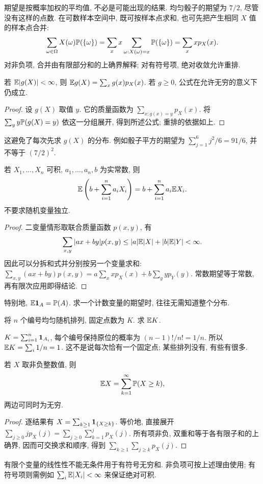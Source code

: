期望是按概率加权的平均值, 不必是可能出现的结果. 均匀骰子的期望为 $7/2$, 尽管没有这样的点数. 在可数样本空间中, 既可按样本点求和, 也可先把产生相同 $X$ 值的样本点合并:
\[
\sum_{\omega\in\Omega}X(\omega)\mathbb P(\{\omega\})
=\sum_xx\sum_{\omega:X(\omega)=x}\mathbb P(\{\omega\})
=\sum_xxp_X(x).
\]
对非负项, 合并由有限部分和的上确界解释; 对有符号项, 绝对收敛允许重排.
\begin{proposition}[函数的期望]
若 $\mathbb E|g(X)|<\infty$, 则 $\mathbb E g(X)=\sum_xg(x)p_X(x)$. 若 $g\ge0$, 公式在允许无穷的意义下仍成立.
\end{proposition}
\begin{proof}
设 $g(X)$ 取值 $y$. 它的质量函数为 $\sum_{x:g(x)=y}p_X(x)$. 将 $\sum_yy\mathbb P(g(X)=y)$ 依这一分组展开, 得到所述公式; 重排的依据如上.
\end{proof}
这避免了每次先求 $g(X)$ 的分布. 例如骰子平方的期望为 $\sum_{j=1}^6j^2/6=91/6$, 并不等于 $(7/2)^2$.

\begin{theorem}[期望的线性性]
若 $X_1,\ldots,X_n$ 可积, $a_1,\ldots,a_n,b$ 为实常数, 则
\[
\mathbb E\left(b+\sum_{i=1}^na_iX_i\right)=b+\sum_{i=1}^na_i\mathbb E X_i.
\]
不要求随机变量独立.
\end{theorem}
\begin{proof}
二变量情形取联合质量函数 $p(x,y)$, 有
\[
\sum_{x,y}|ax+by|p(x,y)\le |a|\mathbb E|X|+|b|\mathbb E|Y|<\infty.
\]
因此可以分拆和式并分别按另一个变量求和:
$\sum_{x,y}(ax+by)p(x,y)=a\sum_xxp_X(x)+b\sum_yyp_Y(y)$.
常数期望等于常数, 再有限次应用即得结论.
\end{proof}
特别地, $\mathbb E\mathbf 1_A=\mathbb P(A)$. 求一个计数变量的期望时, 往往无需知道整个分布.
\begin{example}
将 $n$ 个编号均匀随机排列, 固定点数为 $K$. 求 $\mathbb E K$.
\end{example}
\begin{solution}
$K=\sum_{i=1}^n\mathbf 1_{A_i}$, 每个编号保持原位的概率为 $(n-1)!/n!=1/n$. 所以 $\mathbb E K=\sum_i1/n=1$. 这不是说每次恰有一个固定点; 某些排列没有, 有些有很多.
\end{solution}

\begin{proposition}[整数变量的尾和公式]
若 $X$ 取非负整数值, 则
\[
\mathbb E X=\sum_{k=1}^{\infty}\mathbb P(X\ge k),
\]
两边可同时为无穷.
\end{proposition}
\begin{proof}
逐结果有 $X=\sum_{k\ge1}\mathbf 1_{\{X\ge k\}}$. 等价地, 直接展开
$\sum_{j\ge0}jp_X(j)=\sum_{j\ge0}\sum_{k=1}^jp_X(j)$.
所有项非负, 双重和等于各有限子和的上确界, 因而可交换求和顺序, 得到 $\sum_{k\ge1}\sum_{j\ge k}p_X(j)$.
\end{proof}
有限个变量的线性性不能无条件用于有符号无穷和. 非负项可按上述理由使用; 有符号项则需例如 $\sum_i\mathbb E|X_i|<\infty$ 来保证绝对可积.

